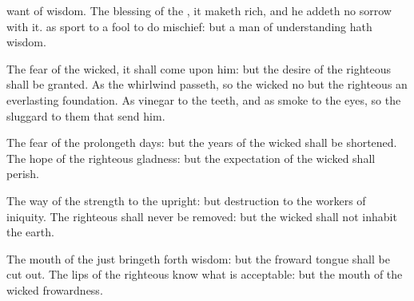 {want of
wisdom.
The
blessing of the
{}, it maketh
rich, and he
addeth no
sorrow with it.
 as
sport to a
fool to
do
mischief: but a
man of
understanding hath
wisdom.
\par }{\PP {}The
fear of the
wicked, it shall
come upon him: but the
desire of the
righteous shall be
granted.
As the
whirlwind
passeth, so
{} the
wicked no
{} but the
righteous
{} an
everlasting
foundation.
As
vinegar to the
teeth, and as
smoke to the
eyes, so
{} the
sluggard to them that
send him.
\par }{\PP {}The
fear of the
{}
prolongeth
days: but the
years of the
wicked shall be
shortened.
The
hope of the
righteous
{}
gladness: but the
expectation of the
wicked shall
perish.
\par }{\PP {}The
way of the
{}
{}
strength to the
upright: but
destruction
{} to the
workers of
iniquity.
The
righteous shall
never be
removed: but the
wicked shall not
inhabit the
earth.
\par }{\PP {}The
mouth of the
just bringeth
forth
wisdom: but the
froward
tongue shall be cut
out.
The
lips of the
righteous
know what is
acceptable: but the
mouth of the
wicked
{}
frowardness.

}
